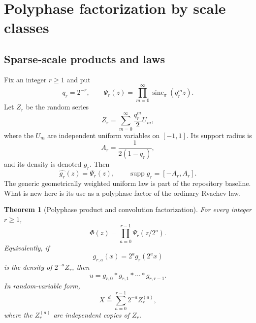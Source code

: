 \documentclass[11pt,oneside]{article}
\numberwithin{equation}{section}
\newtheorem{theorem}{Theorem}[section]
\theoremstyle{definition}
\theoremstyle{remark}
\newcommand{\sincpi}{\operatorname{sinc}_{\pi}}
\newcommand{\supp}{\operatorname{supp}}
\begin{document}
\section{Polyphase factorization by scale classes}
\label{sec:polyphase}

\subsection{Sparse-scale products and laws}

Fix an integer $r\ge1$ and put
\begin{equation}
 q_r=2^{-r},\qquad
 \Psi_r(z)=\prod_{m=0}^{\infty}\sincpi(q_r^m z).            \label{eq:Psi-def}
\end{equation}
Let $Z_r$ be the random series
\begin{equation}
 Z_r=\sum_{m=0}^{\infty}\frac{q_r^m}{2}U_m,                \label{eq:Zr-series}
\end{equation}
where the $U_m$ are independent uniform variables on $[-1,1]$.  Its support
radius is
\begin{equation}
 A_r=\frac1{2(1-q_r)},                                     \label{eq:Ar}
\end{equation}
and its density is denoted $g_r$.  Then
\begin{equation}
 \widehat{g_r}(z)=\Psi_r(z),
 \qquad \supp g_r=[-A_r,A_r].                              \label{eq:gr-Fourier-support}
\end{equation}
The generic geometrically weighted uniform law is part of the repository
baseline.  What is new here is its use as a polyphase factor of the ordinary
Rvachev law.

\begin{theorem}[Polyphase product and convolution factorization]
\label{thm:polyphase-main}
For every integer $r\ge1$,
\begin{equation}
 \boxed{\displaystyle
 \Phi(z)=\prod_{a=0}^{r-1}\Psi_r(z/2^a).}                  \label{eq:polyphase-product}
\end{equation}
Equivalently, if
\begin{equation}
 g_{r,a}(x)=2^a g_r(2^a x)                                 \label{eq:scaled-gr}
\end{equation}
 is the density of $2^{-a}Z_r$, then
\begin{equation}
 \boxed{\displaystyle
 u=g_{r,0}*g_{r,1}*\cdots*g_{r,r-1}.}                       \label{eq:polyphase-convolution}
\end{equation}
In random-variable form,
\begin{equation}
 X\overset{d}=\sum_{a=0}^{r-1}2^{-a}Z_r^{(a)},              \label{eq:polyphase-random}
\end{equation}
where the $Z_r^{(a)}$ are independent copies of $Z_r$.
\end{theorem}
\end{document}

